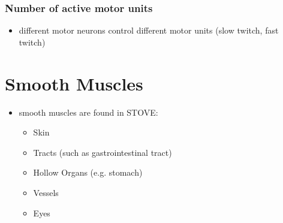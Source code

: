 \documentclass[10pt]{article}
\begin{document}
\subsubsection{Number of active motor units}
\begin{itemize}
    \item different motor neurons control different motor units (slow twitch, fast twitch)
\end{itemize}





\section{Smooth Muscles}
\begin{itemize}
    \item smooth muscles are found in STOVE:
        \begin{itemize}
            \item Skin
            \item Tracts (such as gastrointestinal tract)
            \item Hollow Organs (e.g. stomach)
            \item Vessels
            \item Eyes
        \end{itemize}
\end{itemize}
\end{document}
